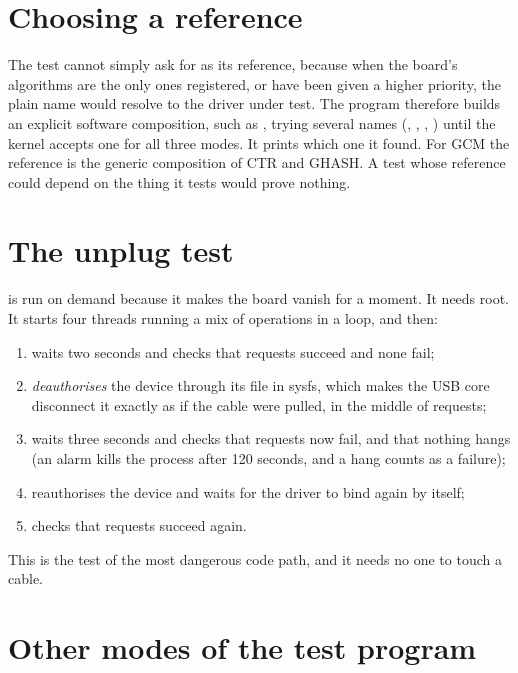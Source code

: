 \section{Choosing a reference}

The test cannot simply ask for  as its reference, because when the board's algorithms are the only ones registered, or have been given a higher priority, the plain name would resolve to the driver under test. The program therefore builds an explicit software composition, such as , trying several names (, , , ) until the kernel accepts one for all three modes. It prints which one it found. For GCM the reference is the generic composition of CTR and GHASH. A test whose reference could depend on the thing it tests would prove nothing.

\section{The unplug test}

 is run on demand because it makes the board vanish for a moment. It needs root. It starts four threads running a mix of operations in a loop, and then:

\begin{enumerate}
  \item waits two seconds and checks that requests succeed and none fail;
  \item \emph{deauthorises} the device through its  file in sysfs, which makes the USB core disconnect it exactly as if the cable were pulled, in the middle of requests;
  \item waits three seconds and checks that requests now fail, and that nothing hangs (an alarm kills the process after 120 seconds, and a hang counts as a failure);
  \item reauthorises the device and waits for the driver to bind again by itself;
  \item checks that requests succeed again.
\end{enumerate}

This is the test of the most dangerous code path, and it needs no one to touch a cable.

\section{Other modes of the test program}

